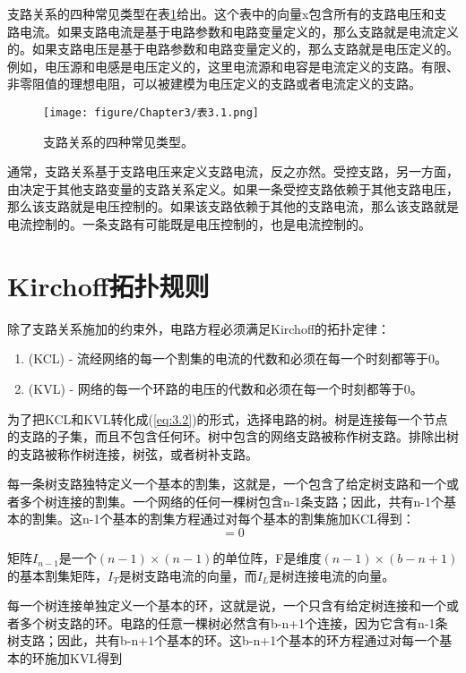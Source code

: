 支路关系的四种常见类型在表\ref{表3.1}给出。这个表中的向量x包含所有的支路电压和支路电流。如果支路电流是基于电路参数和电路变量定义的，那么支路就是电流定义的。如果支路电压是基于电路参数和电路变量定义的，那么支路就是电压定义的。例如，电压源和电感是电压定义的，这里电流源和电容是电流定义的支路。有限、非零阻值的理想电阻，可以被建模为电压定义的支路或者电流定义的支路。

\begin{figure}[htbp]
\small
    \centering
    \texttt{[image: figure/Chapter3/表3.1.png]}
    \caption{支路关系的四种常见类型。}
    \label{表3.1}
\end{figure}

通常，支路关系基于支路电压来定义支路电流，反之亦然。受控支路，另一方面，由决定于其他支路变量的支路关系定义。如果一条受控支路依赖于其他支路电压，那么该支路就是电压控制的。如果该支路依赖于其他的支路电流，那么该支路就是电流控制的。一条支路有可能既是电压控制的，也是电流控制的。

\section{Kirchoff拓扑规则}
除了支路关系施加的约束外，电路方程必须满足Kirchoff的拓扑定律\cite{ref-7}：
\begin{enumerate}
    \item (KCL) - 流经网络的每一个割集的电流的代数和必须在每一个时刻都等于0。
    \item (KVL) - 网络的每一个环路的电压的代数和必须在每一个时刻都等于0。
\end{enumerate}
为了把KCL和KVL转化成(\ref{eq:3.2})的形式，选择电路的树。树是连接每一个节点的支路的子集，而且不包含任何环。树中包含的网络支路被称作树支路。排除出树的支路被称作树连接，树弦，或者树补支路。

每一条树支路独特定义一个基本的割集，这就是，一个包含了给定树支路和一个或者多个树连接的割集。一个网络的任何一棵树包含n-1条支路\cite{ref-7}；因此，共有n-1个基本的割集。这n-1个基本的割集方程通过对每个基本的割集施加KCL得到：
\begin{equation}
    [I_{n-1}|F][\frac{I_T}{I_L}]=0
    \label{eq:3.5}
\end{equation}

矩阵$I_{n-1}$是一个$(n-1)\times(n-1)$的单位阵，F是维度$(n-1)\times(b-n+1)$的基本割集矩阵，$I_T$是树支路电流的向量，而$I_L$是树连接电流的向量。

每一个树连接单独定义一个基本的环，这就是说，一个只含有给定树连接和一个或者多个树支路的环。电路的任意一棵树必然含有b-n+1个连接，因为它含有n-1条树支路；因此，共有b-n+1个基本的环。这b-n+1个基本的环方程通过对每一个基本的环施加KVL得到

